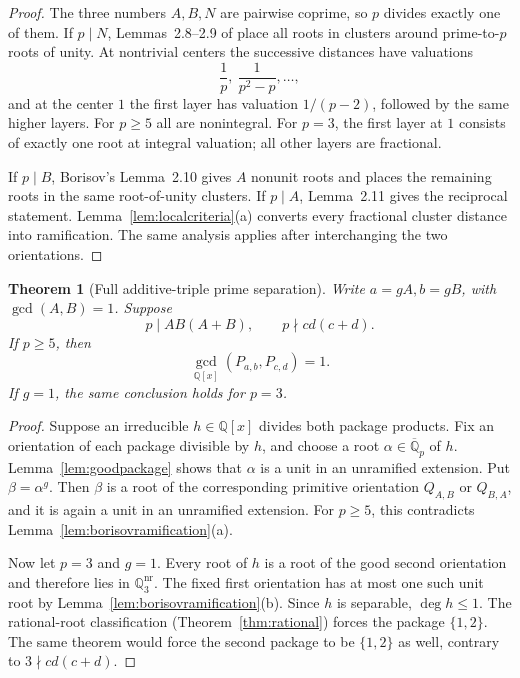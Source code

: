 \documentclass[11pt]{article}
\newtheorem{theorem}{Theorem}[section]
\theoremstyle{definition}
\newcommand{\Q}{\mathbb Q}
\begin{document}
\begin{proof}
The three numbers \(A,B,N\) are pairwise coprime, so \(p\) divides exactly
one of them.  If \(p\mid N\), Lemmas~2.8--2.9 of \cite{Borisov1998} place
all roots in clusters around prime-to-\(p\) roots of unity.  At nontrivial
centers the successive distances have valuations
\[
 \frac1p,\ \frac1{p^2-p},\ldots,
\]
and at the center \(1\) the first layer has valuation \(1/(p-2)\), followed
by the same higher layers.  For \(p\geq5\) all are nonintegral.  For
\(p=3\), the first layer at \(1\) consists of exactly one root at integral
valuation; all other layers are fractional.

If \(p\mid B\), Borisov's Lemma~2.10 gives \(A\) nonunit roots and places
the remaining roots in the same root-of-unity clusters.  If \(p\mid A\),
Lemma~2.11 gives the reciprocal statement.  Lemma~\ref{lem:localcriteria}(a)
converts every fractional cluster distance into ramification.  The same
analysis applies after interchanging the two orientations.
\end{proof}

\begin{theorem}[Full additive-triple prime separation]
\label{thm:fullseparation}
Write \(a=gA,b=gB\), with \(\gcd(A,B)=1\).  Suppose
\begin{equation}
 p\mid AB(A+B),\qquad p\nmid cd(c+d).
 \tag{11.1}
\end{equation}
If \(p\geq5\), then
\begin{equation}
 \gcd_{\Q[x]}(P_{a,b},P_{c,d})=1.
 \tag{11.2}
\end{equation}
If \(g=1\), the same conclusion holds for \(p=3\).
\end{theorem}

\begin{proof}
Suppose an irreducible \(h\in\Q[x]\) divides both package products.  Fix an
orientation of each package divisible by \(h\), and choose a root
\(\alpha\in\overline{\Q}_p\) of \(h\).  Lemma~\ref{lem:goodpackage}
shows that \(\alpha\) is a unit in an unramified extension.  Put
\(\beta=\alpha^g\).  Then \(\beta\) is a root of the corresponding primitive
orientation \(Q_{A,B}\) or \(Q_{B,A}\), and it is again a unit in an
unramified extension.  For \(p\geq5\), this contradicts
Lemma~\ref{lem:borisovramification}(a).

Now let \(p=3\) and \(g=1\).  Every root of \(h\) is a root of the good
second orientation and therefore lies in \(\Q_3^{\mathrm{nr}}\).  The fixed
first orientation has at most one such unit root by
Lemma~\ref{lem:borisovramification}(b).  Since \(h\) is separable,
\(\deg h\leq1\).  The rational-root classification
(Theorem~\ref{thm:rational}) forces the package \(\{1,2\}\).  The same
theorem would force the second package to be \(\{1,2\}\) as well, contrary
to \(3\nmid cd(c+d)\).
\end{proof}
\end{document}

